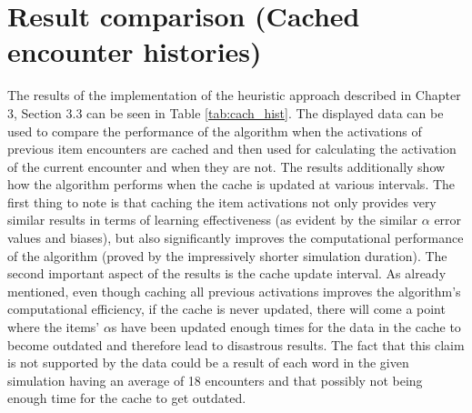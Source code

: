 \documentclass[a4paper]{report}
\begin{document}
\section{Result comparison (Cached encounter histories)}
The results of the implementation of the heuristic approach described in Chapter 3, Section 3.3 can be seen in Table \ref{tab:cach_hist}. The displayed data can be used to compare the performance of the algorithm when the activations of previous item encounters are cached and then used for calculating the activation of the current encounter and when they are not. The results additionally show how the algorithm performs when the cache is updated at various intervals. The first thing to note is that caching the item activations not only provides very similar results in terms of learning effectiveness (as evident by the similar $\alpha$ error values and biases), but also significantly improves the computational performance of the algorithm (proved by the impressively shorter simulation duration). The second important aspect of the results is the cache update interval. As already mentioned, even though caching all previous activations improves the algorithm's computational efficiency, if the cache is never updated, there will come a point where the items' $\alpha$s have been updated enough times for the data in the cache to become outdated and therefore lead to disastrous results. The fact that this claim is not supported by the data could be a result of each word in the given simulation having an average of 18 encounters and that possibly not being enough time for the cache to get outdated.
\end{document}

